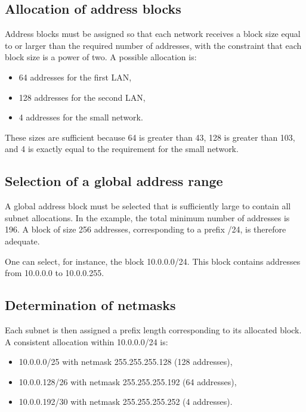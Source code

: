 \documentclass[11pt,a4paper,openany]{report}
\begin{document}
\subsection{Allocation of address blocks}

Address blocks must be assigned so that each network receives a block size equal to or larger than the required number of addresses, with the constraint that each block size is a power of two. A possible allocation is:

\begin{itemize}
\item 64 addresses for the first LAN,
\item 128 addresses for the second LAN,
\item 4 addresses for the small network.
\end{itemize}

These sizes are sufficient because 64 is greater than 43, 128 is greater than 103, and 4 is exactly equal to the requirement for the small network.

\subsection{Selection of a global address range}

A global address block must be selected that is sufficiently large to contain all subnet allocations. In the example, the total minimum number of addresses is 196. A block of size 256 addresses, corresponding to a prefix /24, is therefore adequate.

One can select, for instance, the block 10.0.0.0/24. This block contains addresses from 10.0.0.0 to 10.0.0.255.

\subsection{Determination of netmasks}

Each subnet is then assigned a prefix length corresponding to its allocated block. A consistent allocation within 10.0.0.0/24 is:

\begin{itemize}
\item 10.0.0.0/25 with netmask 255.255.255.128 (128 addresses),
\item 10.0.0.128/26 with netmask 255.255.255.192 (64 addresses),
\item 10.0.0.192/30 with netmask 255.255.255.252 (4 addresses).
\end{itemize}
\end{document}
